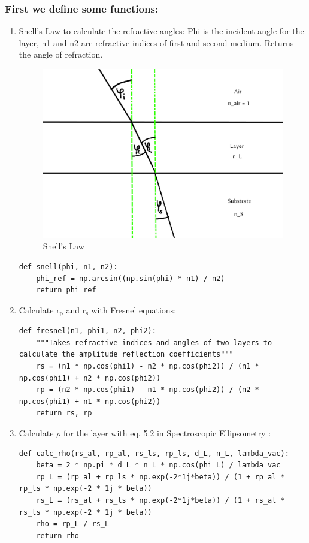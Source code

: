 \documentclass[11pt]{article}
\begin{document}
\subsubsection{First we define some functions:}
\label{sec:orgb2c3d14}
\begin{enumerate}
\item Snell's Law to calculate the refractive angles:
\label{sec:orgbb519ca}
Phi is the incident angle for the layer, n1 and n2 are refractive indices of first and second medium. Returns the angle of refraction.

\begin{figure}[H]
\centering
\includegraphics[width=\textwidth]{./snell.jpg}
\caption{\label{fig:orgabff948}
Snell's Law}
\end{figure}
\begin{verbatim}
def snell(phi, n1, n2):
    phi_ref = np.arcsin((np.sin(phi) * n1) / n2)
    return phi_ref
\end{verbatim}


\item Calculate r\(_{\text{p}}\) and r\(_{\text{s}}\) with Fresnel equations:
\label{sec:org3fc6f01}
\begin{verbatim}
def fresnel(n1, phi1, n2, phi2):
    """Takes refractive indices and angles of two layers to calculate the amplitude reflection coefficients"""
    rs = (n1 * np.cos(phi1) - n2 * np.cos(phi2)) / (n1 * np.cos(phi1) + n2 * np.cos(phi2))
    rp = (n2 * np.cos(phi1) - n1 * np.cos(phi2)) / (n2 * np.cos(phi1) + n1 * np.cos(phi2))
    return rs, rp
\end{verbatim}


\item Calculate \(\rho\) for the layer with eq. 5.2 in Spectroscopic Ellipsometry :
\label{sec:org62a86c4}
\begin{verbatim}
def calc_rho(rs_al, rp_al, rs_ls, rp_ls, d_L, n_L, lambda_vac):
    beta = 2 * np.pi * d_L * n_L * np.cos(phi_L) / lambda_vac
    rp_L = (rp_al + rp_ls * np.exp(-2*1j*beta)) / (1 + rp_al * rp_ls * np.exp(-2 * 1j * beta))
    rs_L = (rs_al + rs_ls * np.exp(-2*1j*beta)) / (1 + rs_al * rs_ls * np.exp(-2 * 1j * beta))
    rho = rp_L / rs_L
    return rho
\end{verbatim}
\end{enumerate}
\end{document}
